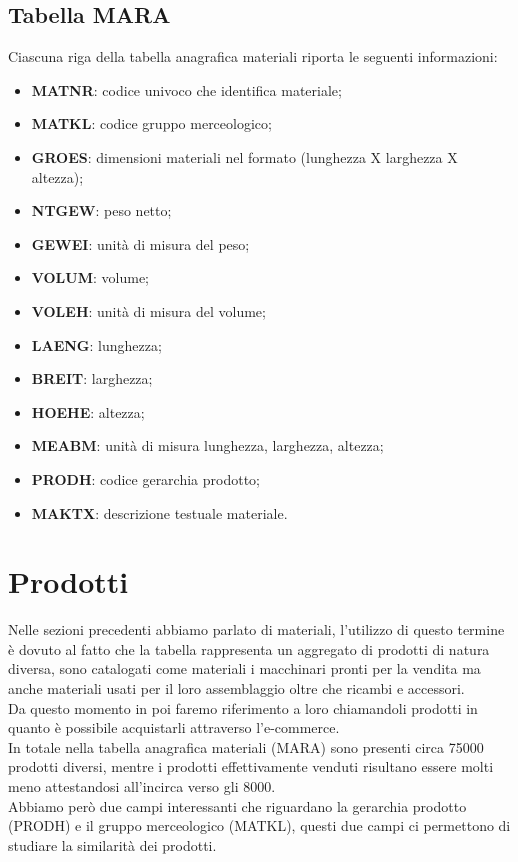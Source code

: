 \subsection{Tabella MARA}
Ciascuna riga della tabella anagrafica materiali riporta le seguenti informazioni:
\begin{itemize}
	\item \textbf{MATNR}: codice univoco che identifica materiale;
	\item \textbf{MATKL}: codice gruppo merceologico;
	\item \textbf{GROES}: dimensioni materiali nel formato (lunghezza X larghezza X altezza);
	\item \textbf{NTGEW}: peso netto;
	\item \textbf{GEWEI}: unità di misura del peso;
	\item \textbf{VOLUM}: volume;
	\item \textbf{VOLEH}: unità di misura del volume;
	\item \textbf{LAENG}: lunghezza;
	\item \textbf{BREIT}: larghezza;
	\item \textbf{HOEHE}: altezza;
	\item \textbf{MEABM}: unità di misura lunghezza, larghezza, altezza;
	\item \textbf{PRODH}: codice gerarchia prodotto; 
	\item \textbf{MAKTX}: descrizione testuale materiale.
\end{itemize}


\section{Prodotti}
Nelle sezioni precedenti abbiamo parlato di materiali, l'utilizzo di questo termine è dovuto al fatto che la tabella rappresenta un aggregato di prodotti di natura diversa, sono catalogati come materiali i macchinari pronti per la vendita ma anche materiali usati per il loro assemblaggio oltre che ricambi e accessori.\\
Da questo momento in poi faremo riferimento a loro chiamandoli prodotti in quanto è possibile acquistarli attraverso l'e-commerce.\\
In totale nella tabella anagrafica materiali (MARA) sono presenti circa 75000 prodotti diversi, mentre i prodotti effettivamente venduti risultano essere molti meno attestandosi all'incirca verso gli 8000.\\
Abbiamo però due campi interessanti che riguardano la gerarchia prodotto (PRODH) e il gruppo merceologico (MATKL), questi due campi ci permettono di studiare la similarità dei prodotti.


